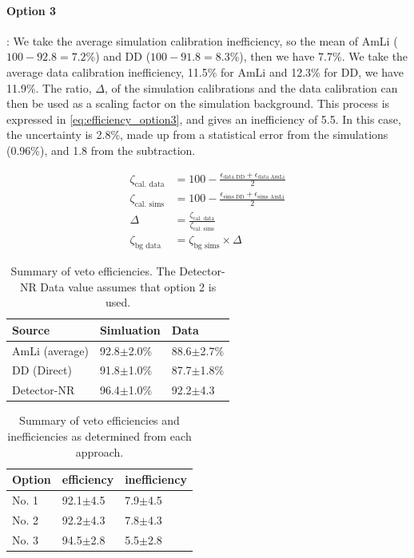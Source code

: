 \paragraph{Option 3}:
We take the average simulation calibration inefficiency, so the mean of AmLi ($100 - 92.8 = 7.2$\%) and DD ($100 - 91.8 = 8.3$\%), then we have 7.7\%.
We take the average data calibration inefficiency, 11.5\% for AmLi and 12.3\% for DD, we have 11.9\%.
The ratio, $\Delta$, of the simulation calibrations and the data calibration can then be used as a scaling factor on the simulation background.
This process is expressed in \autoref{eq:efficiency_option3}, and gives an inefficiency of 5.5.
In this case, the uncertainty is 2.8\%, made up from a statistical error from the simulations (0.96\%), and 1.8 from the subtraction.

\begin{align}
	\zeta_{\textrm{cal. data}} & = 100 - \frac{\epsilon_{\textrm{data DD}} +\epsilon_{\textrm{data AmLi}}}{2}  \\
	\zeta_{\textrm{cal. sims}} & = 100 - \frac{\epsilon_{\textrm{sims DD}} + \epsilon_{\textrm{sims AmLi}}}{2} \\
	\Delta                     & = \frac{\zeta_{\textrm{cal. data}}}{\zeta_{\textrm{cal. sims}}}               \\
	\zeta_{\textrm{bg data}}   & = \zeta_{\textrm{bg sims}} \times \Delta
	\label{eq:efficiency_option3}
\end{align}


\clearpage
\begin{table}
	\centering
	\begin{tabular}{l|l|l}
		Source         & Simluation     & Data           \\ \hline
		AmLi (average) & 92.8$\pm$2.0\% & 88.6$\pm$2.7\% \\
		DD (Direct)    & 91.8$\pm$1.0\% & 87.7$\pm$1.8\% \\
		Detector-NR    & 96.4$\pm$1.0\% & 92.2$\pm$4.3
	\end{tabular}
	\caption{Summary of veto efficiencies.
		The Detector-NR Data value assumes that option 2 is used.}
	\label{tab:final_veto_efficiency}
\end{table}

\begin{table}
	\centering
	\begin{tabular}{l|l|l}
		Option & efficiency   & inefficiency \\ \hline
		No. 1  & 92.1$\pm$4.5 & 7.9$\pm$4.5  \\
		No. 2  & 92.2$\pm$4.3 & 7.8$\pm$4.3  \\
		No. 3  & 94.5$\pm$2.8 & 5.5$\pm$2.8
	\end{tabular}
	\caption{Summary of veto efficiencies and inefficiencies as determined from each approach.}
	\label{tab:efficiency_options}
\end{table}

